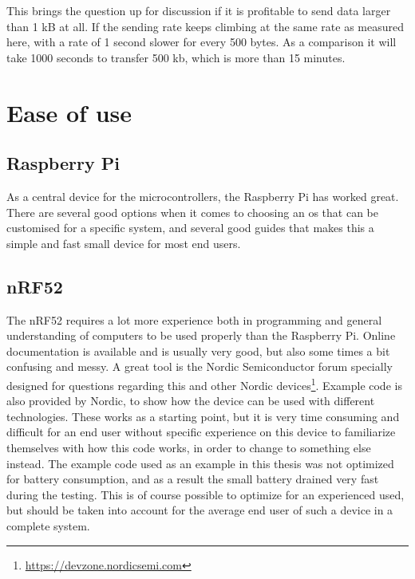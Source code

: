 \noindent This brings the question up for discussion if it is profitable to send data larger than 1 kB at all. If the sending rate keeps climbing at the same rate as measured here, with a rate of 1 second slower for every 500 bytes. As a comparison it will take 1000 seconds to transfer 500 kb, which is more than 15 minutes. 


\section{Ease of use}


\subsection{Raspberry Pi}

\noindent As a central device for the \glspl{microcontroller}, the \gls{Raspberry Pi} has worked great. There are several good options when it comes to choosing an \gls{os} that can be customised for a specific system, and several good guides that makes this a simple and fast small device for most end users. 


\subsection{nRF52}

\noindent The \gls{nRF52} requires a lot more experience both in programming and general understanding of computers to be used properly than the \gls{Raspberry Pi}. Online documentation is available and is usually very good, but also some times a bit confusing and messy. A great tool is the Nordic Semiconductor forum specially designed for questions regarding this and other Nordic devices\footnote{\url{https://devzone.nordicsemi.com}}. Example code is also provided by Nordic, to show how the device can be used with different technologies. These works as a starting point, but it is very time consuming and difficult for an end user without specific experience on this device to familiarize themselves with how this code works, in order to change to something else instead. The example code used as an example in this thesis was not optimized for battery consumption, and as a result the small battery drained very fast during the testing. This is of course possible to optimize for an experienced used, but should be taken into account for the average end user of such a device in a complete system. 





